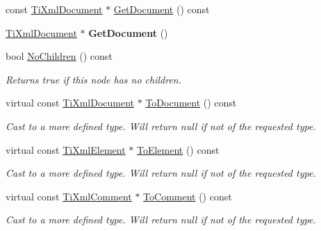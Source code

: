 \begin{DoxyCompactItemize}
\item 
const \hyperlink{class_ti_xml_document}{Ti\+Xml\+Document} $\ast$ \hyperlink{class_ti_xml_node_adcb070acefcbaedaa0673d82e530538b}{Get\+Document} () const
\item 
\mbox{\label{class_ti_xml_node_a7b2372c0e7adfb32f5b6902fe49a39b2}} 
\hyperlink{class_ti_xml_document}{Ti\+Xml\+Document} $\ast$ {\bfseries Get\+Document} ()
\item 
\mbox{\label{class_ti_xml_node_abe85e0ec04ea59c033f324c8504653e5}} 
bool \hyperlink{class_ti_xml_node_abe85e0ec04ea59c033f324c8504653e5}{No\+Children} () const
\begin{DoxyCompactList}\small\item\em Returns true if this node has no children. \end{DoxyCompactList}\item 
\mbox{\label{class_ti_xml_node_a775a904618cad6e4a8049bda4f5a6aa9}} 
virtual const \hyperlink{class_ti_xml_document}{Ti\+Xml\+Document} $\ast$ \hyperlink{class_ti_xml_node_a775a904618cad6e4a8049bda4f5a6aa9}{To\+Document} () const
\begin{DoxyCompactList}\small\item\em Cast to a more defined type. Will return null if not of the requested type. \end{DoxyCompactList}\item 
\mbox{\label{class_ti_xml_node_a4080428f2cac46e92ef4d284202fad0b}} 
virtual const \hyperlink{class_ti_xml_element}{Ti\+Xml\+Element} $\ast$ \hyperlink{class_ti_xml_node_a4080428f2cac46e92ef4d284202fad0b}{To\+Element} () const
\begin{DoxyCompactList}\small\item\em Cast to a more defined type. Will return null if not of the requested type. \end{DoxyCompactList}\item 
\mbox{\label{class_ti_xml_node_a5ad43b9d545315e9bb4f50d4cb70de9e}} 
virtual const \hyperlink{class_ti_xml_comment}{Ti\+Xml\+Comment} $\ast$ \hyperlink{class_ti_xml_node_a5ad43b9d545315e9bb4f50d4cb70de9e}{To\+Comment} () const
\begin{DoxyCompactList}\small\item\em Cast to a more defined type. Will return null if not of the requested type. \end{DoxyCompactList}\item 

\end{DoxyCompactItemize}

